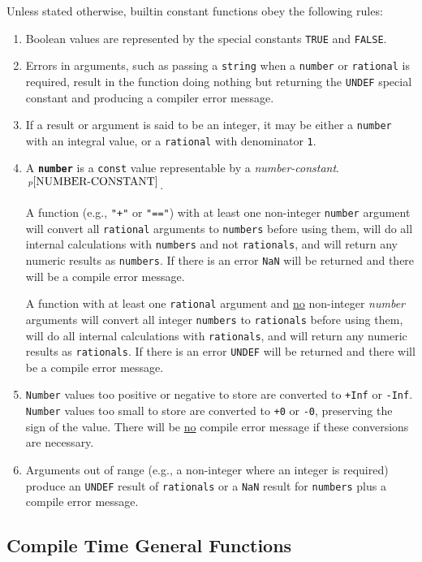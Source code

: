 \documentclass[12pt]{article}
\newcommand{\ttkey}[1]{{\tt \bfseries #1}}
\newcommand{\pagnote}[1]{$\,^{p\pageref{#1}}$}
\begin{document}
Unless stated otherwise, builtin constant functions
obey the following rules:
\begin{enumerate}
\item
Boolean values are represented by the special constants
{\tt TRUE} and {\tt FALSE}.
\item
Errors in arguments, such as passing a {\tt string} when a
{\tt number} or {\tt rational} is required, result in the
function doing nothing but returning
the {\tt UNDEF} special constant and producing
a compiler error message.
\item
If a result or argument is said to be an integer, it may
be either a {\tt number} with an integral value, or a
{\tt rational} with denominator {\tt 1}.
\item\label{NUMBER-RULE}
A \ttkey{number} is a {\tt const} value representable by a
{\em number-constant}.\pagnote{NUMBER-CONSTANT}.

A function (e.g., {\tt "+"} or {\tt "=="})
with at least one non-integer {\tt number} argument will
convert all {\tt rational} arguments to {\tt numbers}
before using them, will do all internal calculations with
{\tt numbers} and not {\tt rationals},
and will return any numeric results as {\tt numbers}.
If there is an error {\tt NaN} will be returned and there will
be a compile error message.

A function with at least one {\tt rational} argument and
\underline{no} non-integer {\em number} arguments will
convert all integer {\tt numbers} to {\tt rationals}
before using them, will do all internal calculations with
{\tt rationals}, and will return any numeric results as {\tt rationals}.
If there is an error {\tt UNDEF} will be returned and there will
be a compile error message.

\item
{\tt Number} values too positive or negative to store
are converted to {\tt +Inf} or {\tt -Inf}.
{\tt Number} values too small to store
are converted to {\tt +0} or {\tt -0}, preserving the
sign of the value.  There will be \underline{no} compile
error message if these conversions are necessary.

\item
Arguments out of range (e.g., a non-integer where an integer is required)
produce an {\tt UNDEF} result of {\tt rationals} or a {\tt NaN} result
for {\tt numbers} plus a compile error message.
\end{enumerate}

\subsection{Compile Time General Functions}
\end{document}
